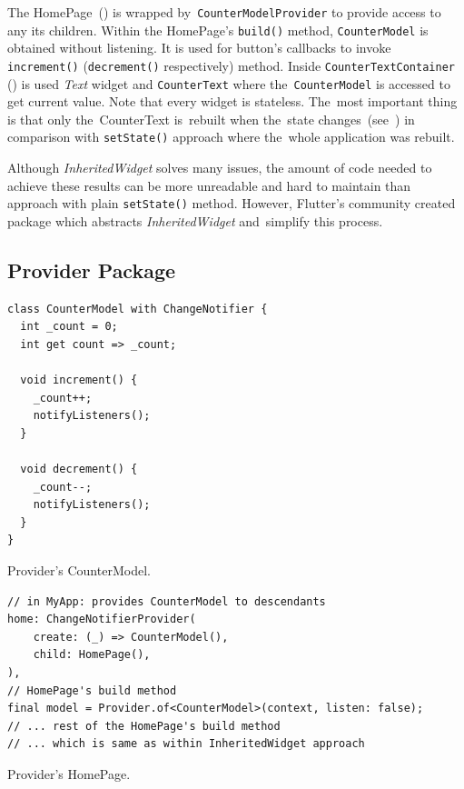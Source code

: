 The HomePage~() is wrapped by~\verb|CounterModelProvider| to provide access to any its children. Within the HomePage's \verb|build()| method, \verb|CounterModel| is obtained without listening. It is used for button's callbacks to invoke \verb|increment()| (\verb|decrement()| respectively) method. Inside \verb|CounterTextContainer| () is used \textit{Text} widget and \verb|CounterText| where the~\verb|CounterModel| is accessed to get current value. Note that every widget is stateless. The~most important thing is that only the~CounterText is~rebuilt when the~state changes~(see~) in comparison with \verb|setState()| approach where the~whole application was rebuilt.

Although \textit{InheritedWidget} solves many issues, the amount of code needed to achieve these results can be more unreadable and hard to maintain than approach with plain \verb|setState()| method. However, Flutter's community created package which abstracts \textit{InheritedWidget} and~simplify this process. 
\subsection{Provider Package}

\begin{listing}[ht]
\begin{verbatim}
class CounterModel with ChangeNotifier {
  int _count = 0;
  int get count => _count;

  void increment() {
    _count++;
    notifyListeners();
  }

  void decrement() {
    _count--;
    notifyListeners();
  }
}
\end{verbatim}
\caption{Provider's CounterModel.}
\label{listing:counter-provider-model}
\end{listing}

\begin{listing}[ht]
\begin{verbatim}
// in MyApp: provides CounterModel to descendants
home: ChangeNotifierProvider(
    create: (_) => CounterModel(),
    child: HomePage(),
),
// HomePage's build method
final model = Provider.of<CounterModel>(context, listen: false);
// ... rest of the HomePage's build method
// ... which is same as within InheritedWidget approach
\end{verbatim}
\caption{Provider's HomePage.}
\label{listing:counter-provider-home-page}
\end{listing}

